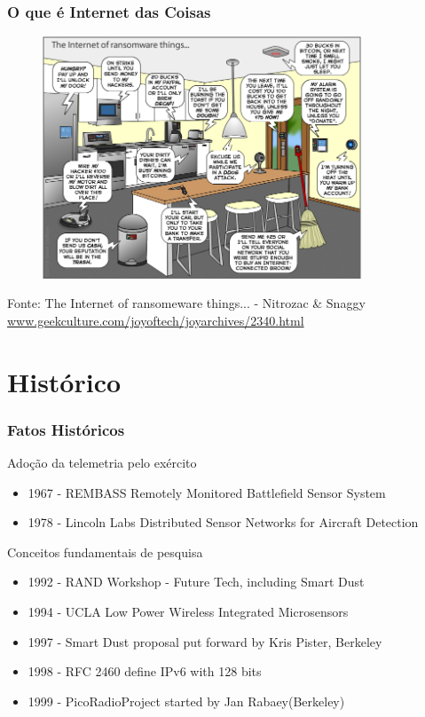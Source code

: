 \documentclass{beamer}
\begin{document}
\begin{frame}
	\frametitle{O que é Internet das Coisas}
	\begin{figure}
		\includegraphics[width=0.85\textwidth]{thejoyoftech-geekculture}
	\end{figure}
	\scriptsize Fonte: The Internet of ransomeware things... - Nitrozac \& Snaggy\\
	\tiny \url{www.geekculture.com/joyoftech/joyarchives/2340.html}
\end{frame}

\section{Histórico}

\begin{frame}
\frametitle{Fatos Históricos}

Adoção da telemetria pelo exército
\begin{itemize}
	\item 1967 - REMBASS Remotely Monitored Battlefield Sensor System
	\item 1978 - Lincoln Labs Distributed Sensor Networks for Aircraft Detection
\end{itemize}

Conceitos fundamentais de pesquisa

\begin{itemize}
	\item 1992 - RAND Workshop  - Future Tech, including Smart Dust
	\item 1994 - UCLA Low Power Wireless Integrated Microsensors
	\item 1997 - Smart Dust proposal put forward by Kris Pister, Berkeley
	\item 1998 - RFC 2460 define IPv6 with 128 bits
	\item 1999 - PicoRadioProject started by Jan Rabaey(Berkeley)
\end{itemize}

\end{frame}
\end{document}

